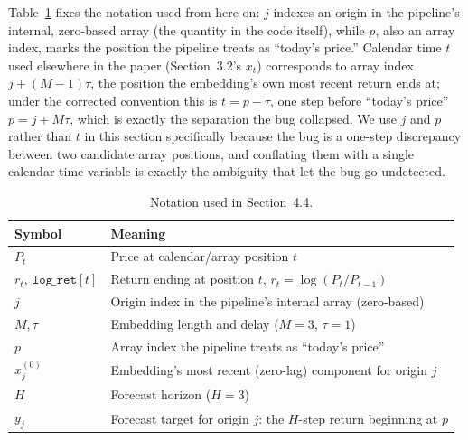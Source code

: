 \documentclass[preprint,12pt]{elsarticle}
\begin{document}
Table~\ref{tab:notation} fixes the notation used from here on: $j$ indexes an origin in the
pipeline's internal, zero-based array (the quantity in the code itself), while $p$, also an
array index, marks the position the pipeline treats as ``today's price.'' Calendar time $t$ used
elsewhere in the paper (Section~3.2's $x_t$) corresponds to array index $j+(M-1)\tau$, the
position the embedding's own most recent return ends at; under the corrected convention this is
$t=p-\tau$, one step before ``today's price'' $p=j+M\tau$, which is exactly the separation the
bug collapsed. We use $j$ and $p$ rather than $t$ in this section specifically because the bug
is a one-step discrepancy between two candidate array positions, and conflating them with a
single calendar-time variable is exactly the ambiguity that let the bug go undetected.

\begin{table}[h]
\centering
\caption{Notation used in Section~4.4.}
\label{tab:notation}
\begin{tabular}{@{}lp{10cm}@{}}
\toprule
Symbol & Meaning \\
\midrule
$P_t$ & Price at calendar/array position $t$ \\
$r_t,\ \texttt{log\_ret}[t]$ & Return ending at position $t$, $r_t = \log(P_t/P_{t-1})$ \\
$j$ & Origin index in the pipeline's internal array (zero-based) \\
$M,\tau$ & Embedding length and delay ($M=3$, $\tau=1$) \\
$p$ & Array index the pipeline treats as ``today's price'' \\
$x_j^{(0)}$ & Embedding's most recent (zero-lag) component for origin $j$ \\
$H$ & Forecast horizon ($H=3$) \\
$y_j$ & Forecast target for origin $j$: the $H$-step return beginning at $p$ \\
\bottomrule
\end{tabular}
\end{table}
\end{document}
